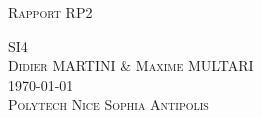 ﻿%


\begin{titlepage}

\begin{center}

\Large
\textsc{Rapport RP2}\\

\vspace{5cm}

\textsc{SI4\\[0.5\baselineskip]
Didier MARTINI \& Maxime MULTARI 
}\\

\vspace{5cm}
\textsc{\today}\\ %

\vspace{1cm}
\textsc{Polytech Nice Sophia Antipolis}\\

\end{center}

\end{titlepage}
